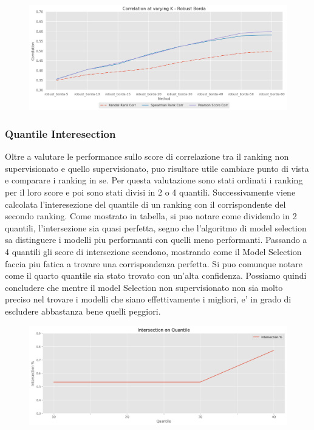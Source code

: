 \begin{figure}[t]
\includegraphics[width=14cm, scale=1]{images/varying-k}
\centering
\end{figure}

\subsubsection{Quantile Interesection}
Oltre a valutare le performance sullo score di correlazione tra il ranking non supervisionato e quello supervisionato, puo risultare utile cambiare punto di vista e comparare i ranking in se.
Per questa valutazione sono stati ordinati i ranking per il loro score e poi sono stati divisi in 2 o 4 quantili. Successivamente viene calcolata l'interesezione del quantile di un ranking con il corrispondente del secondo ranking.
Come mostrato in tabella, si puo notare come dividendo in 2 quantili, l'intersezione sia quasi perfetta, segno che l'algoritmo di model selection sa distinguere i modelli piu performanti con quelli meno performanti.
Passando a 4 quantili gli score di intersezione scendono, mostrando come il Model Selection faccia piu fatica a trovare una corrispondenza perfetta. Si puo comunque notare come il quarto quantile sia stato trovato con un'alta confidenza.
Possiamo quindi concludere che mentre il model Selection non supervisionato non sia molto preciso nel trovare i modelli che siano effettivamente i migliori, e' in grado di escludere abbastanza bene quelli peggiori.

\begin{figure}[t]
\includegraphics[width=14cm, scale=1]{images/4quantile}
\centering
\end{figure}

